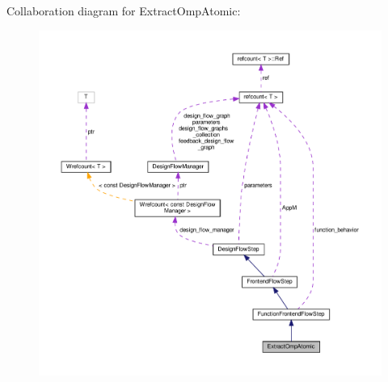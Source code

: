 Collaboration diagram for Extract\+Omp\+Atomic\+:
\nopagebreak
\begin{figure}[H]
\begin{center}
\leavevmode
\includegraphics[width=350pt]{de/dc2/classExtractOmpAtomic__coll__graph}
\end{center}
\end{figure}
